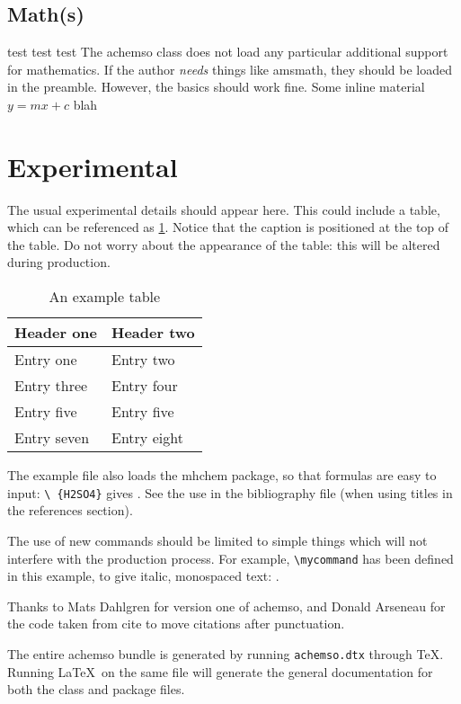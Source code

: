 \subsection{Math(s)}
test test test The \textsf{achemso} class does not load any particular additional
support for mathematics.  If the author \emph{needs} things like \textsf{amsmath}, they should be loaded in the preamble.  However, the basics should work fine.  Some inline material $y = mx + c$ blah 

\section{Experimental}

The usual experimental details should appear here.  This could
include a table, which can be referenced as \ref{tbl:example}. Notice
that the caption is positioned at the top of the table. Do not worry
about the appearance of the table: this will be altered during
production.
\begin{table}
  \caption{An example table}
  \label{tbl:example}
  \begin{tabular}{ll}
    \hline
    Header one & Header two \\
    \hline
    Entry one & Entry two \\
    Entry three & Entry four \\
    Entry five & Entry five \\
    Entry seven & Entry eight \\
    \hline
  \end{tabular}
\end{table}


The example file also loads the \textsf{mhchem} package, so
that formulas are easy to input: \texttt{\textbackslash
\ce\{H2SO4\}} gives .  See the use in the
bibliography file (when using titles in the references
section).

The use of new commands should be limited to simple things which will
not interfere with the production process.  For example,
\texttt{\textbackslash mycommand} has been defined in this example,
to give italic, monospaced text: .

\acknowledgement

Thanks to Mats Dahlgren for version one of \textsf{achemso},
and Donald Arseneau for the code taken from \textsf{cite} to
move citations after punctuation.


\suppinfo

The entire \textsf{achemso} bundle is generated by running
\texttt{achemso.dtx} through \TeX. Running \LaTeX\ on the same file
will generate the general documentation for both the class and
package files.





